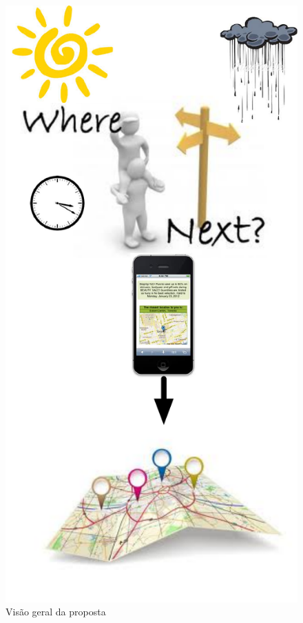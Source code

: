 \documentclass[10pt,a4paper,twocolumn]{article}
\begin{document}
\begin{figure}[!hbt]
\centering
\includegraphics[scale=0.25]{figuras/exemplo.pdf}
\caption{Visão geral da proposta}
\label{fig:visao_geral}
\end{figure}
\end{document}
